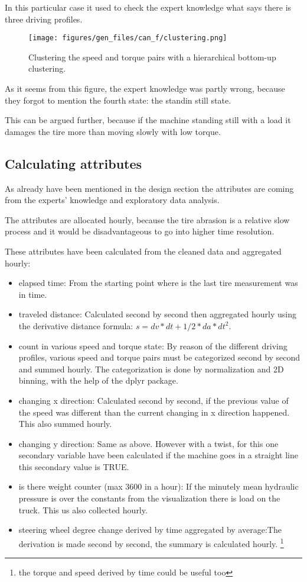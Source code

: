 	In this particular case it used to check the expert knowledge what says there is three driving profiles.
	\begin{figure}[H]
			\centering
			\texttt{[image: figures/gen\_files/can\_f/clustering.png]}
			\caption{Clustering the speed and torque pairs with a hierarchical bottom-up clustering.} 
	\end{figure}
	As it seems from this figure, the expert knowledge was partly wrong, because they forgot to mention the fourth state: the standin still state.

	This can be argued further, because if the machine standing still with a load it damages the tire more than moving slowly with low torque.
\subsection{Calculating attributes}
As already have been mentioned in the design section the attributes are coming from the experts' knowledge and exploratory data analysis.

The attributes are allocated hourly, because the tire abrasion is a relative slow process and it would be disadvantageous to go into higher time resolution.

These attributes have been calculated from the cleaned data and aggregated hourly:
	\begin{itemize}
		\item{elapsed time:} From the starting point where is the last tire measurement was in time.
		\item{traveled distance:} Calculated second by second then aggregated hourly using the derivative distance formula: $s = dv*dt + 1/2*da*dt^2$.
		\item{count in various speed and torque state:} By reason of the different driving profiles, various speed and torque pairs must be categorized second by second and summed hourly. The categorization is done by normalization and 2D binning, with the help of the dplyr package.
		\item{changing x direction:} Calculated second by second, if the previous value of the speed was different than the current changing in x direction happened. This also summed hourly.
		\item{changing y direction:} Same as above. However with a twist, for this one secondary variable have been calculated if the machine goes in a straight line this secondary value is TRUE.
		\item{is there weight counter (max 3600 in a hour):} If the minutely mean hydraulic pressure is over the constants from the visualization there is load on the truck. This us also collected hourly.
		\item{steering wheel degree change derived by time aggregated by average:}The derivation is made second by second, the summary is calculated hourly.
		\footnote{the torque and speed derived by time could be useful too}
	\end{itemize}
